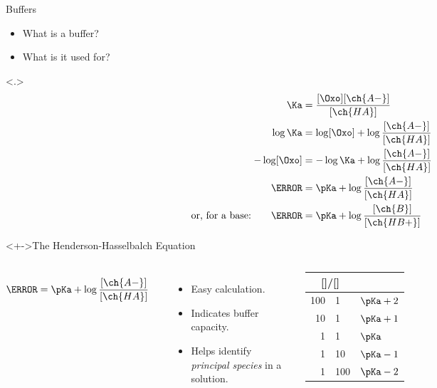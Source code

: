 \documentclass[notes=hide]{beamer}
\begin{document}

\begin{frame}[t]{Buffers}
	\begin{itemize}[<+->]
		\item What is a buffer?
		\item What is it used for?
	\end{itemize}

	{%
		\begin{align*}
			\Ka &= \frac{[\Oxo][\ch{A-}]}{[\ch{HA}]} \\
			\log\Ka &= \log[\Oxo] + \log\frac{[\ch{A-}]}{[\ch{HA}]} \\
			-\log[\Oxo] &= -\log\Ka + \log\frac{[\ch{A-}]}{[\ch{HA}]} \\
			\pH &= \pKa + \log\frac{[\ch{A-}]}{[\ch{HA}]} \\
			\text{or, for a base:} \qquad
			\pH &= \pKa + \log\frac{[\ch{B}]}{[\ch{HB+}]} \\
		\end{align*}
	}


	\begin{block}<+->{The Henderson-Hasselbalch Equation}
		\begin{columns}
			\begin{align*}
				\pH &= \pKa + \log\frac{[\ch{A-}]}{[\ch{HA}]}
			\end{align*}
			\begin{itemize}
				\item Easy \pH{} calculation.
				\item Indicates buffer capacity.
				\item Helps identify \emph{principal
					species} in a solution.
			\end{itemize}
			\begin{tabular} {r@{/}l l}
				\multicolumn{2}{c}{[\ch{A-}]/[\ch{HA}]} &
				\multicolumn{1}{c}{\pH} \\ \midrule
				100 & 1   & $\pKa + 2$ \\
				10  & 1   & $\pKa + 1$ \\
				1   & 1   & $\pKa$ \\
				1   & 10  & $\pKa - 1$ \\
				1   & 100 & $\pKa - 2$
			\end{tabular}
		\end{columns}
	\end{block}
\end{frame}
\end{document}
